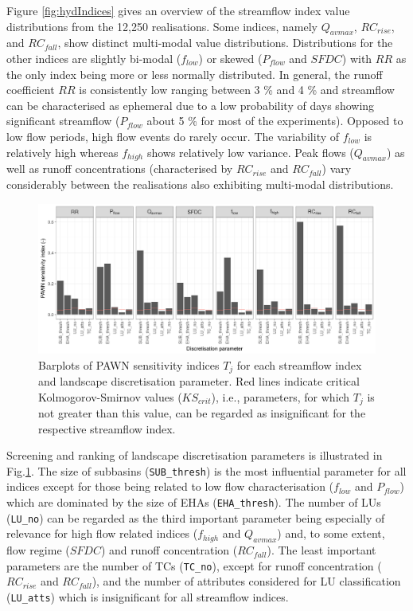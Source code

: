 Figure \ref{fig:hydIndices} gives an overview of the streamflow index value distributions from the 12,250 realisations.
Some indices, namely $Q_{avmax}$, $RC_{rise}$, and $RC_{fall}$, show distinct multi-modal value distributions.
Distributions for the other indices are slightly bi-modal ($f_{low}$) or skewed ($P_{flow}$ and $SFDC$) with $RR$ as the only index being more or less normally distributed.
In general, the runoff coefficient $RR$ is consistently low ranging between 3 \unit{\%} and 4 \unit{\%} and streamflow can be characterised as ephemeral due to a low probability of days showing significant streamflow ($P_{flow}$ about 5 \unit{\%} for most of the experiments).
Opposed to low flow periods, high flow events do rarely occur.
The variability of $f_{low}$ is relatively high whereas $f_{high}$ shows relatively low variance.
Peak flows ($Q_{avmax}$) as well as runoff concentrations (characterised by $RC_{rise}$ and $RC_{fall}$) vary considerably between the realisations also exhibiting multi-modal distributions.

\begin{figure}[t]
\includegraphics[width=\linewidth]{../analysis/sensitivity/sensitivity_PAWN_bars.png}
\caption{Barplots of PAWN sensitivity indices $T_j$ for each streamflow index and landscape discretisation parameter. Red lines indicate critical Kolmogorov-Smirnov values ($KS_{crit}$), i.e., parameters, for which $T_j$ is not greater than this value, can be regarded as insignificant for the respective streamflow index.}
\label{fig:PAWNbars}
\end{figure}

Screening and ranking of landscape discretisation parameters is illustrated in Fig.\DIFaddbegin \DIFadd{\ }\DIFaddend \ref{fig:PAWNbars}.
The size of subbasins (\verb!SUB_thresh!) is the most influential parameter for all indices except for those being related to low flow characterisation ($f_{low}$ and $P_{flow}$) which are dominated by the size of EHAs (\verb!EHA_thresh!).
The number of LUs (\verb!LU_no!) can be regarded as the third important parameter being especially of relevance for high flow related indices ($f_{high}$ and $Q_{avmax}$) and, to some extent, flow regime ($SFDC$) and runoff concentration ($RC_{fall}$).
The least important parameters are the number of TCs (\verb!TC_no!), except for runoff concentration ($RC_{rise}$ and $RC_{fall}$), and the number of attributes considered for LU classification (\verb!LU_atts!) which is insignificant for all streamflow indices.

